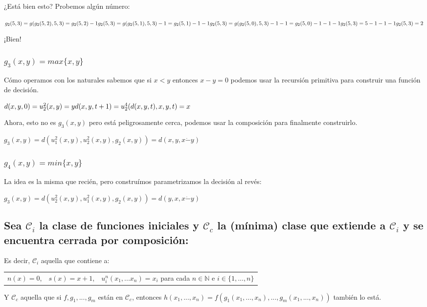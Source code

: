 \documentclass[11pt]{article} %
\newcommand{\desarrollo}[1]{

    \hspace{2em}
    \begin{minipage}{\textwidth}
        #1
    \end{minipage}

}
\newcommand{\nat}{\mathbb{N}}
\newcommand{\Ccur}{\mathcal{C}}
\begin{document}
¿Está bien esto? Probemos algún número:
\desarrollo{$
g_2(5, 3) = g(g_2(5, 2), 5, 3) = g_2(5, 2) - 1 \\
g_2(5, 3) = g(g_2(5, 1), 5, 3) - 1 = g_2(5, 1) - 1 - 1 \\
g_2(5, 3) = g(g_2(5, 0), 5, 3) - 1 - 1 = g_2(5, 0) - 1 - 1 - 1 \\
g_2(5, 3) = 5 - 1 - 1 - 1 \\
g_2(5, 3) = 2
$}

¡Bien!

\subsubsection{$g_3(x,y)=max\{x,y\}$}

Cómo operamos con los naturales sabemos que si $x < y$ entonces $x - y = 0$ podemos usar la recursión primitiva para construir una función de decisión.
\desarrollo{$
d(x, y, 0) = u^2_2(x, y) = y \\
d(x, y, t+1) = u^4_2(d(x, y, t), x, y, t) = x
$}

Ahora, esto no es $g_3(x,y)$ pero está peligrosamente cerca, podemos usar la composición para finalmente construirlo.
\desarrollo{$
g_3(x,y) = d(u^2_1(x, y), u^2_2(x, y), g_2(x,y)) = d(x, y, x \dot- y)
$}

\subsubsection{$g_4(x,y)=min\{x,y\}$}

La idea es la misma que recién, pero construímos parametrizamos la decisión al revés:
\desarrollo{$
g_3(x,y) = d(u^2_2(x,y), u^2_1(x,y), g_2(x,y)) = d(y, x, x \dot- y)
$}

\subsection{Sea $\Ccur_i$ la clase de funciones iniciales y $\Ccur_c$ la (mínima) clase que extiende a $\Ccur_i$ y se encuentra cerrada por composición:}

Es decir, $\Ccur_i$ aquella que contiene a:

\begin{tabular}{lcr}
$n(x)=0$, &
$s(x)=x+1$, &
$u^n_i(x_1,...x_n)=x_i$ para cada $n \in \nat$ e $i \in \{1, ..., n\}$
\end{tabular}

Y $\Ccur_c$ aquella que si $f, g_1, ..., g_m$ están en $\Ccur_c$, entonces $h(x_1, ..., x_n) = f(g_1(x_1, ..., x_n), ..., g_m(x_1, ..., x_n))$ también lo está.
\end{document}
